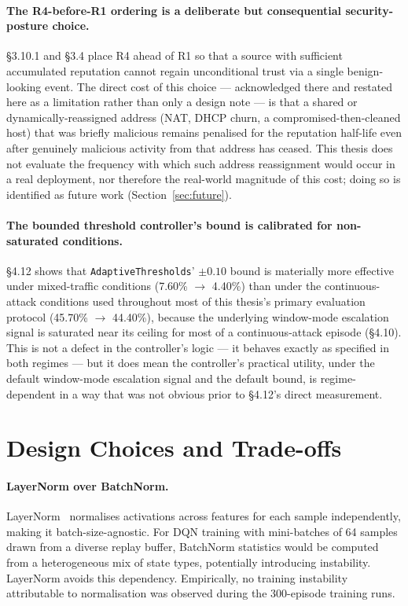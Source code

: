 \paragraph{The R4-before-R1 ordering is a deliberate but consequential
security-posture choice.}
\S3.10.1 and \S3.4 place R4 ahead of R1 so that a source with sufficient
accumulated reputation cannot regain unconditional trust via a single
benign-looking event.
The direct cost of this choice --- acknowledged there and restated here as
a limitation rather than only a design note --- is that a shared or
dynamically-reassigned address (NAT, DHCP churn, a compromised-then-cleaned
host) that was briefly malicious remains penalised for the reputation
half-life even after genuinely malicious activity from that address has
ceased.
This thesis does not evaluate the frequency with which such address
reassignment would occur in a real deployment, nor therefore the
real-world magnitude of this cost; doing so is identified as future work
(Section~\ref{sec:future}).

\paragraph{The bounded threshold controller's bound is calibrated for
non-saturated conditions.}
\S4.12 shows that \texttt{AdaptiveThresholds}' $\pm 0.10$ bound is
materially more effective under mixed-traffic conditions (7.60\%
$\rightarrow$ 4.40\%) than under the continuous-attack conditions used
throughout most of this thesis's primary evaluation protocol (45.70\%
$\rightarrow$ 44.40\%), because the underlying window-mode escalation
signal is saturated near its ceiling for most of a continuous-attack
episode (\S4.10).
This is not a defect in the controller's logic --- it behaves exactly as
specified in both regimes --- but it does mean the controller's practical
utility, under the default window-mode escalation signal and the default
bound, is regime-dependent in a way that was not obvious prior to
\S4.12's direct measurement.

\section{Design Choices and Trade-offs}
\label{sec:disc_design}

\paragraph{LayerNorm over BatchNorm.}
LayerNorm~\citep{ba2016layer} normalises activations across features for
each sample independently, making it batch-size-agnostic.
For DQN training with mini-batches of 64 samples drawn from a diverse
replay buffer, BatchNorm statistics would be computed from a
heterogeneous mix of state types, potentially introducing instability.
LayerNorm avoids this dependency.
Empirically, no training instability attributable to normalisation was
observed during the 300-episode training runs.


